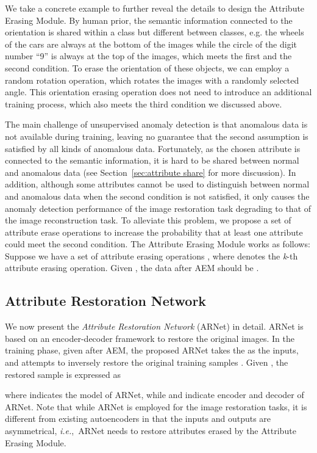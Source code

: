 \documentclass[journal]{IEEEtran}
\begin{document}
We take a concrete example to further reveal the details to design the Attribute Erasing Module. By human prior, the semantic information connected to the orientation is shared within a class but different between classes, e.g. the wheels of the cars are always at the bottom of the images while the circle of the digit number ``9'' is always at the top of the images, which meets the first and the second condition. To erase the orientation of these objects, we can employ a random rotation operation, which rotates the images with a randomly selected angle. This orientation erasing operation does not need to introduce an additional training process, which also meets the third condition we discussed above. 

The main challenge of unsupervised anomaly detection is that anomalous data is not available during training, leaving no guarantee that the second assumption is satisfied by all kinds of anomalous data. Fortunately, as the chosen attribute is connected to the semantic information, it is hard to be shared between normal and anomalous data (see Section~\ref{sec:attribute share} for more discussion). In addition, although some attributes cannot be used to distinguish between normal and anomalous data when the second condition is not satisfied, it only causes the anomaly detection performance of the image restoration task degrading to that of the image reconstruction task. To alleviate this problem, we propose a set of attribute erase operations to increase the probability that at least one attribute could meet the second condition.
The Attribute Erasing Module works as follows:
Suppose we have a set of attribute erasing operations , where  denotes the \emph{k}-th attribute erasing operation. Given , the data after AEM should be .

\subsection{Attribute Restoration Network}
We now present the \emph{Attribute Restoration Network} (ARNet) in detail. ARNet is based on an encoder-decoder framework to restore the original images. 
In the training phase, given  after AEM,
the proposed ARNet takes the  as the inputs, and attempts to inversely restore the original training samples . Given , the restored sample  is expressed as
                     
where  indicates the model of ARNet, while  and  indicate encoder and decoder of ARNet. 
Note that while ARNet is employed for the image restoration tasks, it is different from existing autoencoders in that the inputs and outputs are asymmetrical, \emph{i.e.},~ARNet needs to restore attributes erased by the Attribute Erasing Module.
\end{document}
